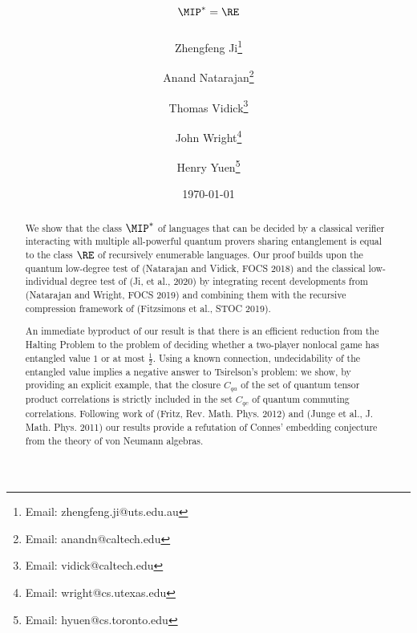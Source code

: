  

\title{$\MIP^* = \RE$}
\author[1]{Zhengfeng Ji\footnote{Email: zhengfeng.ji@uts.edu.au}}
\author[2,3]{Anand Natarajan\footnote{Email: anandn@caltech.edu}}
\author[3]{Thomas Vidick\footnote{Email: vidick@caltech.edu}}
\author[2,3,4]{John Wright\footnote{Email: wright@cs.utexas.edu}}
\author[5]{Henry Yuen\footnote{Email: hyuen@cs.toronto.edu}}

\date{\today}
\maketitle

\noteswarning


\begin{abstract}
We show that the class $\MIP^*$ of languages that can be decided by a
classical verifier interacting with multiple all-powerful
quantum provers sharing entanglement is equal to the class $\RE$ of recursively
enumerable languages. Our proof builds upon the quantum low-degree test of (Natarajan and Vidick, FOCS 2018) and the classical low-individual degree test of (Ji, et al., 2020) by integrating recent developments from (Natarajan and Wright, FOCS 2019) and combining them with the recursive compression framework of (Fitzsimons et al., STOC 2019).

An immediate byproduct of our result is that there is an efficient reduction from the Halting Problem to the problem of deciding whether a two-player nonlocal game has entangled value $1$ or at most $\frac{1}{2}$.
Using a known connection, undecidability of the entangled value implies a negative answer to Tsirelson's problem: we show, by providing an explicit example, that the closure $C_{qa}$ of the set of quantum tensor product correlations is strictly included in the set $C_{qc}$ of quantum commuting correlations. Following work of (Fritz, Rev. Math. Phys. 2012) and (Junge et al., J. Math. Phys. 2011) our results provide a refutation of Connes' embedding conjecture from the theory of von Neumann algebras.

\end{abstract}

\newpage

\tableofcontents


